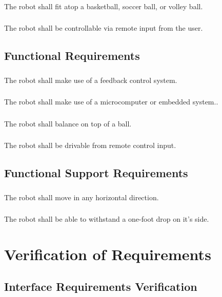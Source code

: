\documentclass[12pt,a4paper]{article}
\begin{document}
\begin{flushleft}
				\subsubsection{} The robot shall fit atop a basketball, soccer ball, or volley ball.
				\subsubsection{} The robot shall be controllable via remote input from the user.
			\subsection{Functional Requirements}
				\subsubsection{} The robot shall make use of a feedback control system.
				\subsubsection{} The robot shall make use of a microcomputer or embedded system..
				\subsubsection{} The robot shall balance on top of a ball.
				\subsubsection{} The robot shall be drivable from remote control input.
			\subsection{Functional Support Requirements}
				\subsubsection{} The robot shall move in any horizontal direction.
				\subsubsection{} The robot shall be able to withstand a one-foot drop on it's side.
		
		\pagebreak		
		\section{Verification of Requirements}
			\subsection{Interface Requirements Verification}

\end{flushleft}
\end{document}

